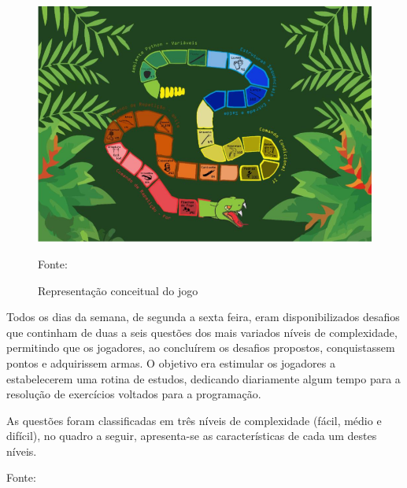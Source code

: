 \begin{figure}[h]
	\centering
	\includegraphics[keepaspectratio=true,scale=0.25]{figuras/desafioSerpente.png}
	\caption{Representação conceitual do jogo}
	Fonte: \cite{raposo2016desafio}
	\label{figura1}
\end{figure}

Todos os dias da semana, de segunda a sexta feira, eram disponibilizados desafios que continham de duas a seis
questões dos mais variados níveis de complexidade, permitindo que os jogadores, ao concluírem os desafios propostos, 
conquistassem pontos e adquirissem armas. O objetivo era estimular os jogadores a estabelecerem uma rotina de estudos,
dedicando diariamente algum tempo para a resolução de exercícios voltados para a programação.

As questões foram classificadas em três níveis de complexidade (fácil, médio e difícil), no quadro a seguir, apresenta-se
as características de cada um destes níveis.

\begin{table}[h]
	\centering
	\caption{Classificação das questões}
	Fonte: \cite{raposo2016desafio}
\end{table}

